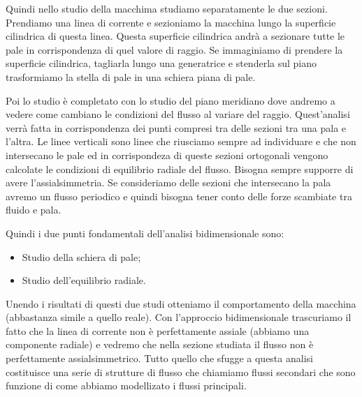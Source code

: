 Quindi nello studio della macchima studiamo separatamente le due sezioni.
Prendiamo una linea di corrente e sezioniamo la macchina lungo la superficie
cilindrica di questa linea. Questa superficie cilindrica andrà a sezionare tutte le
pale in corrispondenza di quel valore di raggio. Se immaginiamo di prendere la
superficie cilindrica, tagliarla lungo una generatrice e stenderla sul piano
trasformiamo la stella di pale in una schiera piana di pale.

Poi lo studio è completato con lo studio del piano meridiano dove andremo a
vedere come cambiano le condizioni del flusso al variare del raggio.
Quest’analisi verrà fatta in corrispondenza dei punti compresi tra delle sezioni
tra una pala e l’altra. Le linee verticali sono linee che riusciamo sempre ad
individuare e che non intersecano le pale ed in corrispondeza di queste sezioni
ortogonali vengono calcolate le condizioni di equilibrio radiale del flusso.
Bisogna sempre supporre di avere l’assialsimmetria. Se consideriamo delle
sezioni che intersecano la pala avremo un flusso periodico e quindi bisogna
tener conto delle forze scambiate tra fluido e pala.

Quindi i due punti fondamentali dell’analisi bidimensionale sono:
\begin{itemize}
\item Studio della schiera di pale;
\item Studio dell’equilibrio radiale.
\end{itemize}
Unendo i risultati di questi due studi otteniamo il comportamento della
macchina (abbastanza simile a quello reale).
Con l’approccio bidimensionale trascuriamo il fatto che la linea di corrente non
è perfettamente assiale (abbiamo una componente radiale) e vedremo che
nella sezione studiata il flusso non è perfettamente assialsimmetrico. Tutto
quello che sfugge a questa analisi costituisce una serie di strutture di flusso
che chiamiamo flussi secondari che sono funzione di come abbiamo modellizato
i flussi principali.

